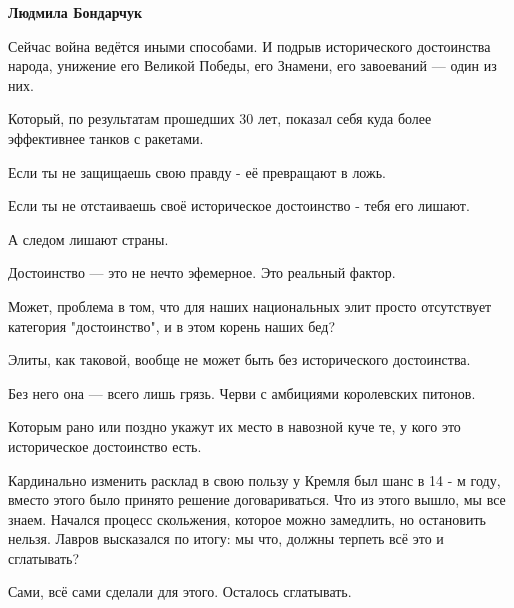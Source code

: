 \begin{itemize}
\begin{itemize}
\textbf{Людмила Бондарчук} 

Сейчас война ведётся иными способами. И подрыв исторического достоинства
народа, унижение его Великой Победы, его Знамени, его завоеваний — один из них.

Который, по результатам прошедших 30 лет, показал себя куда более эффективнее танков с ракетами.

Если ты не защищаешь свою правду - её превращают в ложь.

Если ты не отстаиваешь своё историческое достоинство - тебя его лишают.

А следом лишают страны.

Достоинство — это не нечто эфемерное. Это реальный фактор.

Может, проблема в том, что для наших национальных элит просто отсутствует
категория "достоинство", и в этом корень наших бед?

Элиты, как таковой, вообще не может быть без исторического достоинства.

Без него она — всего лишь грязь. Черви с амбициями королевских питонов.

Которым рано или поздно укажут их место в навозной куче те, у кого это историческое достоинство есть.

Кардинально изменить расклад в свою пользу у Кремля был шанс в 14 - м году,
вместо этого было принято решение договариваться. Что из этого вышло, мы все
знаем. Начался процесс скольжения, которое можно замедлить, но остановить
нельзя. Лавров высказался по итогу: мы что, должны терпеть всё это и
сглатывать?

Сами, всё сами сделали для этого. Осталось сглатывать.

\end{itemize}

\end{itemize}

